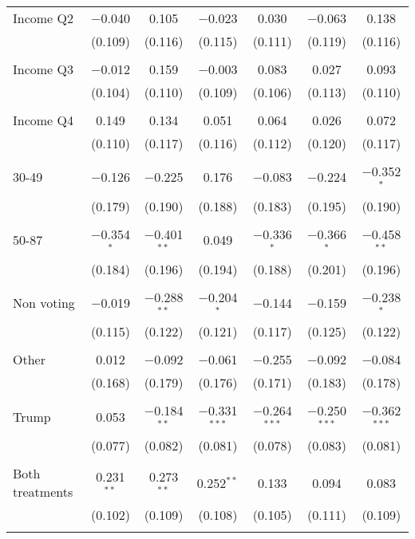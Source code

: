 \begin{tabular}{@{\extracolsep{5pt}}lcccccc}
 Income Q2 & $-$0.040 & 0.105 & $-$0.023 & 0.030 & $-$0.063 & 0.138 \\ 
  & (0.109) & (0.116) & (0.115) & (0.111) & (0.119) & (0.116) \\ 
  & & & & & & \\ 
 Income Q3 & $-$0.012 & 0.159 & $-$0.003 & 0.083 & 0.027 & 0.093 \\ 
  & (0.104) & (0.110) & (0.109) & (0.106) & (0.113) & (0.110) \\ 
  & & & & & & \\ 
 Income Q4 & 0.149 & 0.134 & 0.051 & 0.064 & 0.026 & 0.072 \\ 
  & (0.110) & (0.117) & (0.116) & (0.112) & (0.120) & (0.117) \\ 
  & & & & & & \\ 
 30-49 & $-$0.126 & $-$0.225 & 0.176 & $-$0.083 & $-$0.224 & $-$0.352$^{*}$ \\ 
  & (0.179) & (0.190) & (0.188) & (0.183) & (0.195) & (0.190) \\ 
  & & & & & & \\ 
 50-87 & $-$0.354$^{*}$ & $-$0.401$^{**}$ & 0.049 & $-$0.336$^{*}$ & $-$0.366$^{*}$ & $-$0.458$^{**}$ \\ 
  & (0.184) & (0.196) & (0.194) & (0.188) & (0.201) & (0.196) \\ 
  & & & & & & \\ 
 Non voting & $-$0.019 & $-$0.288$^{**}$ & $-$0.204$^{*}$ & $-$0.144 & $-$0.159 & $-$0.238$^{*}$ \\ 
  & (0.115) & (0.122) & (0.121) & (0.117) & (0.125) & (0.122) \\ 
  & & & & & & \\ 
 Other & 0.012 & $-$0.092 & $-$0.061 & $-$0.255 & $-$0.092 & $-$0.084 \\ 
  & (0.168) & (0.179) & (0.176) & (0.171) & (0.183) & (0.178) \\ 
  & & & & & & \\ 
 Trump & 0.053 & $-$0.184$^{**}$ & $-$0.331$^{***}$ & $-$0.264$^{***}$ & $-$0.250$^{***}$ & $-$0.362$^{***}$ \\ 
  & (0.077) & (0.082) & (0.081) & (0.078) & (0.083) & (0.081) \\ 
  & & & & & & \\ 
 Both treatments & 0.231$^{**}$ & 0.273$^{**}$ & 0.252$^{**}$ & 0.133 & 0.094 & 0.083 \\ 
  & (0.102) & (0.109) & (0.108) & (0.105) & (0.111) & (0.109) \\ 
  & & & & & & \\ 

\end{tabular}
